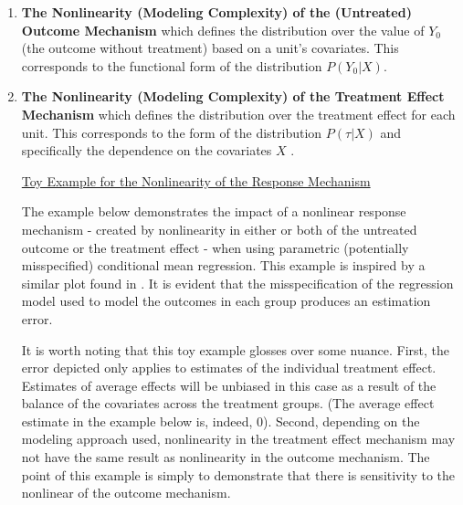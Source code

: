 \documentclass[../main.tex]{subfiles}
\begin{document}
\vspace{\baselineskip}
\begin{enumerate}
	\item \textbf{The Nonlinearity (Modeling Complexity) of the (Untreated) Outcome Mechanism} which defines the distribution over the value of  \( Y_{0} \)  (the outcome without treatment) based on a unit’s covariates. This corresponds to the functional form of the distribution  \( P \left( Y_{0}  \vert  X \right)  \). \par


\vspace{\baselineskip}
	\item \textbf{The Nonlinearity (Modeling Complexity) of the Treatment Effect Mechanism} which defines the distribution over the treatment effect for each unit. This corresponds to the form of the distribution  \( P \left(  \tau  \vert  X \right)  \)  and specifically the dependence on the covariates  \( X \) . \par

\uline{Toy Example for the Nonlinearity of the Response Mechanism}\par

\vspace{\baselineskip}

The example below demonstrates the impact of a nonlinear response mechanism - created by nonlinearity in either or both of the untreated outcome or the treatment effect - when using parametric (potentially misspecified) conditional mean regression. This example is inspired by a similar plot found in \cite{Hill2011BayesianInference}. It is evident that the misspecification of the regression model used to model the outcomes in each group produces an estimation error.

\vspace{\baselineskip}

It is worth noting that this toy example glosses over some nuance. First, the error depicted only applies to estimates of the individual treatment effect. Estimates of average effects will be unbiased in this case as a result of the balance of the covariates across the treatment groups. (The average effect estimate in the example below is, indeed, 0). Second, depending on the modeling approach used, nonlinearity in the treatment effect mechanism may not have the same result as nonlinearity in the outcome mechanism. The point of this example is simply to demonstrate that there is sensitivity to the nonlinear of the outcome mechanism.


\end{enumerate}
\end{document}
